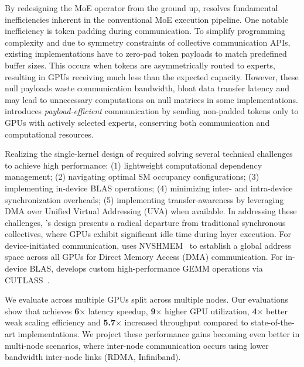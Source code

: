 By redesigning the MoE operator from the ground up,
\sysname resolves fundamental inefficiencies inherent in the conventional MoE execution pipeline. One notable inefficiency is token padding during communication.
To simplify programming complexity and due to symmetry constraints of collective communication APIs, existing implementations have to zero-pad token payloads to match predefined buffer sizes. This occurs when tokens are asymmetrically routed to experts, resulting in GPUs receiving much less than the expected capacity.
However, these null payloads waste communication bandwidth, bloat data transfer latency and may lead to
unnecessary computations on null matrices in some implementations. \sysname introduces \emph{payload-efficient} communication by sending non-padded tokens only to GPUs with actively selected experts, conserving both communication and computational resources.

Realizing the single-kernel design of \sysname required
solving several technical challenges to achieve high performance: (1) lightweight computational dependency management; (2) navigating optimal SM occupancy configurations; (3) implementing in-device BLAS operations; (4) minimizing inter- and intra-device synchronization overheads; (5) implementing transfer-awareness by leveraging DMA over Unified Virtual Addressing (UVA) when available. In addressing these challenges, \sysname's design presents a radical departure from traditional synchronous \alltoall collectives, where GPUs exhibit significant idle time during layer execution. For device-initiated communication, \sysname uses NVSHMEM~\cite{nvshm} to establish a global address space across all GPUs for Direct Memory Access (DMA) communication. For in-device BLAS, \sysname develops custom high-performance GEMM operations via CUTLASS~\cite{Thakkar_CUTLASS_2023}.

We evaluate \sysname across multiple GPUs split across multiple nodes.
Our evaluations show that \sysname achieves \textbf{6}$\times$ latency speedup,
\textbf{9}$\times$ higher GPU utilization, \textbf{4}$\times$ better weak scaling efficiency and \textbf{5.7}$\times$
increased throughput compared to state-of-the-art implementations.
We project these performance gains becoming even better in multi-node scenarios,
where inter-node communication occurs using lower bandwidth inter-node links (\eg RDMA, Infiniband).
